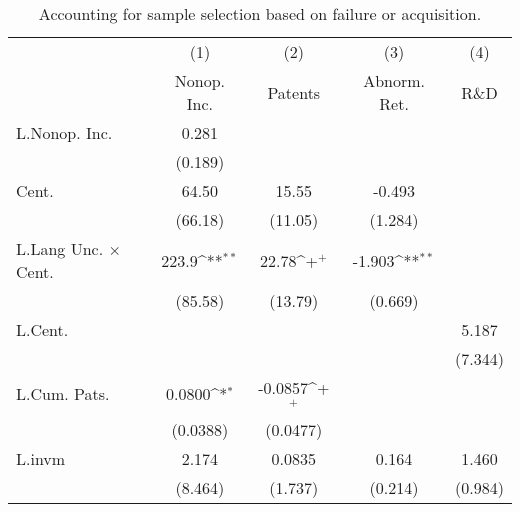 \begin{table}
\begin{center}
\caption[Sample Selection on Exit]{Accounting for sample selection based on failure or acquisition.\label{sel3}}
\vspace{0.3in}

{
\def\sym#1{\ifmmode^{#1}\else\(^{#1}\)\fi}
\begin{tabular}{l*{4}{c}}
\hline\hline
                    &\multicolumn{1}{c}{(1)}&\multicolumn{1}{c}{(2)}&\multicolumn{1}{c}{(3)}&\multicolumn{1}{c}{(4)}\\
                    &\multicolumn{1}{c}{Nonop. Inc.}&\multicolumn{1}{c}{Patents}&\multicolumn{1}{c}{Abnorm. Ret.}&\multicolumn{1}{c}{R\&D}\\
\hline
L.Nonop. Inc.       &       0.281         &                     &                     &                     \\
                    &     (0.189)         &                     &                     &                     \\
Cent.               &       64.50         &       15.55         &      -0.493         &                     \\
                    &     (66.18)         &     (11.05)         &     (1.284)         &                     \\
L.Lang Unc. $\times$ Cent.&       223.9\sym{**} &       22.78\sym{+}  &      -1.903\sym{**} &                     \\
                    &     (85.58)         &     (13.79)         &     (0.669)         &                     \\
L.Cent.             &                     &                     &                     &       5.187         \\
                    &                     &                     &                     &     (7.344)         \\
L.Cum. Pats.        &      0.0800\sym{*}  &     -0.0857\sym{+}  &                     &                     \\
                    &    (0.0388)         &    (0.0477)         &                     &                     \\
L.invm              &       2.174         &      0.0835         &       0.164         &       1.460         \\
                    &     (8.464)         &     (1.737)         &     (0.214)         &     (0.984)         \\

\end{tabular}}
\end{center}
\end{table}
